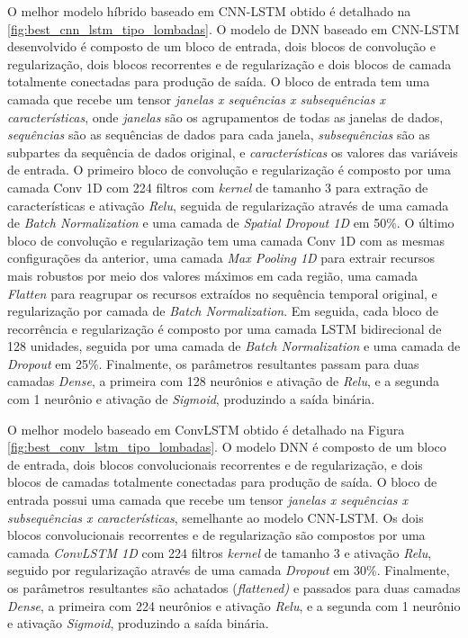 O melhor modelo híbrido baseado em CNN-LSTM obtido é detalhado na \autoref{fig:best_cnn_lstm_tipo_lombadas}. O modelo de DNN baseado em CNN-LSTM desenvolvido é composto de um bloco de entrada, dois blocos de convolução e regularização, dois blocos recorrentes e de regularização e dois blocos de camada totalmente conectadas para produção de saída. O bloco de entrada tem uma camada que recebe um tensor \emph{janelas x sequências x subsequências x características}, onde \emph{janelas} são os agrupamentos de todas as janelas de dados, \emph{sequências} são as sequências de dados para cada janela, \emph{subsequências} são as subpartes da sequência de dados original, e \emph{características} os valores das variáveis de entrada. O primeiro bloco de convolução e regularização é composto por uma camada Conv 1D com 224 filtros com  \textit{kernel} de tamanho 3 para extração de características e ativação \textit{Relu}, seguida de regularização através de uma camada de \textit{Batch Normalization} e uma camada de \textit{Spatial Dropout 1D} em 50\%. O último bloco de convolução e regularização tem uma camada Conv 1D com as mesmas configurações da anterior, uma camada \textit{Max Pooling 1D} para extrair recursos mais robustos por meio dos valores máximos em cada região, uma camada \textit{Flatten} para reagrupar os recursos extraídos no sequência temporal original, e regularização por camada de \textit{Batch Normalization}. Em seguida, cada bloco de recorrência e regularização é composto por uma camada LSTM bidirecional de 128 unidades, seguida por uma camada de \textit{Batch Normalization} e uma camada de \textit{Dropout} em 25\%. Finalmente, os parâmetros resultantes passam para duas camadas \textit{Dense}, a primeira com 128 neurônios e ativação de \textit{Relu}, e a segunda com 1 neurônio e ativação de \textit{Sigmoid}, produzindo a saída binária. 

O melhor modelo baseado em ConvLSTM obtido é detalhado na Figura \autoref{fig:best_conv_lstm_tipo_lombadas}. O modelo DNN é composto de um bloco de entrada, dois blocos convolucionais recorrentes e de regularização, e dois blocos de camadas totalmente conectadas para produção de saída. O bloco de entrada possui uma camada que recebe um tensor \emph{janelas x sequências x subsequências x características}, semelhante ao modelo CNN-LSTM. Os dois blocos convolucionais recorrentes e de regularização são compostos por uma camada \textit{ConvLSTM 1D} com 224 filtros \textit{kernel} de tamanho 3 e ativação \textit{Relu}, seguido por regularização através de uma camada \textit{Dropout} em 30\%. Finalmente, os parâmetros resultantes são achatados (\textit{flattened)} e passados para duas camadas \textit{Dense}, a primeira com 224 neurônios e ativação \textit{Relu}, e a segunda com 1 neurônio e ativação \textit{Sigmoid}, produzindo a saída binária.

